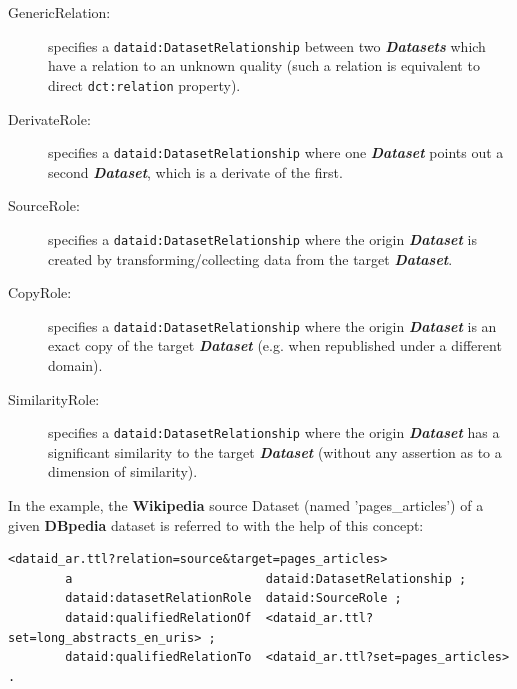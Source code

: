 \documentclass[a4paper,english,twoside,BCOR1.5cm,headsepline,DIV12,appendixprefix,final,12pt]{scrbook}
\newcommand{\dbpedia}{{\ttfamily\bfseries DBpedia}\xspace}
\newcommand{\wikipedia}{{\ttfamily\bfseries Wikipedia}\xspace}
\newcommand{\prop}[1]{{{\texttt{#1}}}}
\newcommand{\important}[1]{\textbf{\textit{#1}}}
\begin{document}
\begin{description}
\item[GenericRelation:] specifies a \prop{dataid:DatasetRelationship} between two \important{Datasets} which have a relation to an unknown quality (such a relation is equivalent to direct \prop{dct:relation} property).
\item[DerivateRole:] specifies a \prop{dataid:DatasetRelationship} where one \important{Dataset} points out a second \important{Dataset}, which is a derivate of the first.
\item[SourceRole:] specifies a \prop{dataid:DatasetRelationship} where the origin \important{Dataset} is created by transforming/collecting data from the target \important{Dataset}.
\item[CopyRole:] specifies a \prop{dataid:DatasetRelationship} where the origin \important{Dataset} is an exact copy of the target \important{Dataset} (e.g. when republished under a different domain).
\item[SimilarityRole:] specifies a \prop{dataid:DatasetRelationship} where the origin \important{Dataset} has a significant similarity to the target \important{Dataset} (without any assertion as to a dimension of similarity).
\end{description}

In the example, the \wikipedia source Dataset (named 'pages\_articles') of a given \dbpedia dataset is referred to with the help of this concept:
\\
\begin{lstlisting}[language=ttl, captionpos=b,caption=Example of an organisation,label=lst:coresuperset,linewidth=\columnwidth,breaklines=true]
<dataid_ar.ttl?relation=source&target=pages_articles>
        a                           dataid:DatasetRelationship ;
        dataid:datasetRelationRole  dataid:SourceRole ;
        dataid:qualifiedRelationOf  <dataid_ar.ttl?set=long_abstracts_en_uris> ;
        dataid:qualifiedRelationTo  <dataid_ar.ttl?set=pages_articles> .  
\end{lstlisting}
\end{document}
